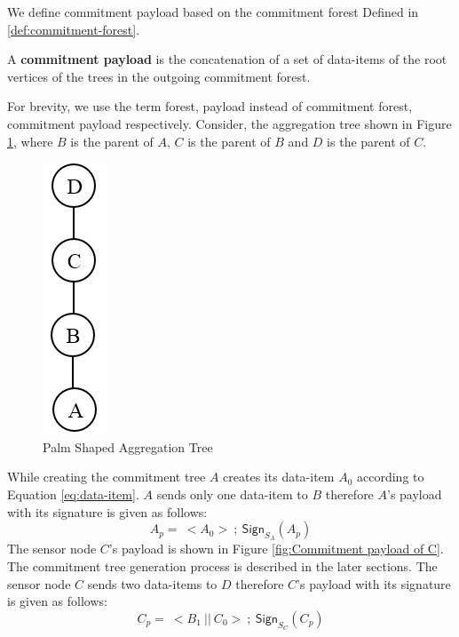 	We define commitment payload based on the commitment forest Defined in \ref{def:commitment-forest}.
	\begin{definition}
		A \textbf{commitment payload} is the concatenation of a set of data-items of the root vertices of the trees in the outgoing commitment forest.
	\end{definition}
	For brevity, we use the term forest, payload instead of commitment forest, commitment payload respectively.
	Consider, the aggregation tree shown in Figure \ref{fig:Palm aggregation tree}, where $B$ is the parent of $A$, $C$ is the parent of $B$ and $D$ is the parent of $C$. 
	\begin{figure}[h!]
		\centering
		\includegraphics[scale = 1]{images/palm-aggregation-tree.png}
		\caption{Palm Shaped Aggregation Tree}
		\label{fig:Palm aggregation tree}
	\end{figure}
	While creating the commitment tree $A$ creates its data-item $A_{0}$ according to Equation \ref{eq:data-item}.
	$A$ sends only one data-item to $B$ therefore $A$'s payload with its signature is given as follows:
	\begin{equation}
		A_{p} =\ <A_{0}>\ ;\ \textsf{Sign}_{S_{A}}(A_{p})
	\end{equation}
	The sensor node $C$'s payload is shown in Figure \ref{fig:Commitment payload of C}.
	The commitment tree generation process is described in the later sections. 
	The sensor node $C$ sends two data-items to $D$ therefore $C$'s payload with its signature is given as follows:
	\begin{equation}
	 	C_{p} =\ <B_{1}\ ||\ C_{0}>\ ;\ \textsf{Sign}_{S_{C}}(C_{p})
	\end{equation}

